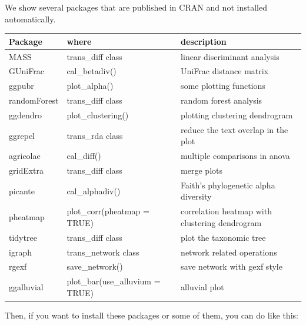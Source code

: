 \documentclass[
]{book}
\begin{document}
We show several packages that are published in CRAN and not installed automatically.

\begin{tabular}{l|l|l}
\hline
Package & where & description\\
\hline
MASS & trans\_diff class & linear discriminant analysis\\
\hline
GUniFrac & cal\_betadiv() & UniFrac distance matrix\\
\hline
ggpubr & plot\_alpha() & some plotting functions\\
\hline
randomForest & trans\_diff class & random forest analysis\\
\hline
ggdendro & plot\_clustering() & plotting clustering dendrogram\\
\hline
ggrepel & trans\_rda class & reduce the text overlap in the plot\\
\hline
agricolae & cal\_diff() & multiple comparisons in anova\\
\hline
gridExtra & trans\_diff class & merge plots\\
\hline
picante & cal\_alphadiv() & Faith’s phylogenetic alpha diversity\\
\hline
pheatmap & plot\_corr(pheatmap = TRUE) & correlation heatmap with clustering dendrogram\\
\hline
tidytree & trans\_diff class & plot the taxonomic tree\\
\hline
igraph & trans\_network class & network related operations\\
\hline
rgexf & save\_network() & save network with gexf style\\
\hline
ggalluvial & plot\_bar(use\_alluvium = TRUE) & alluvial plot\\
\hline
\end{tabular}

Then, if you want to install these packages or some of them, you can do like this:
\end{document}
